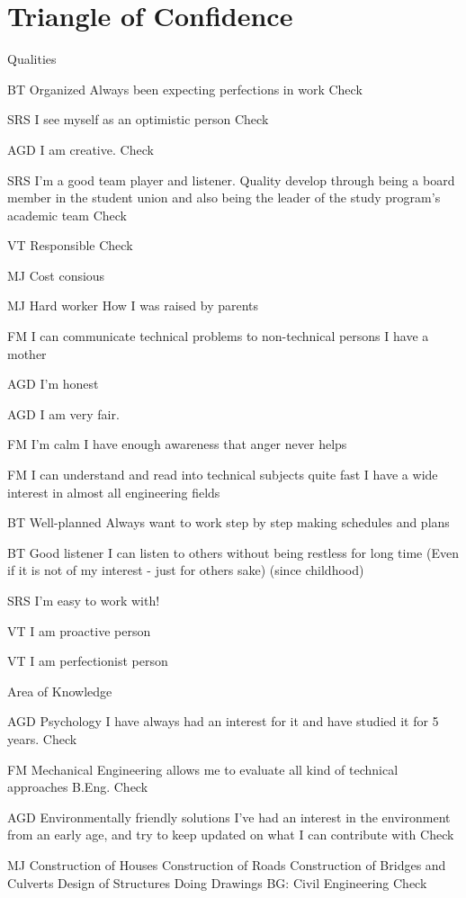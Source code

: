 \section{Triangle of Confidence}

Qualities

BT
Organized
Always been expecting perfections in work
Check


SRS
I see myself as an optimistic person
Check


AGD
I am creative.
Check

SRS
I'm a good team player and listener.
Quality develop through being a board member in the student union and also being the leader of the study program's academic team
Check

VT
Responsible
Check




MJ
Cost consious

MJ
Hard worker
How I was raised by parents

FM
I can communicate technical problems to non-technical persons
I have a mother

AGD
I'm honest

AGD
I am very fair.

FM
I'm calm
I have enough awareness that anger never helps

FM
I can understand and read into technical subjects quite fast
I have a wide interest in almost all engineering fields


BT
Well-planned
Always want to work step by step making schedules and plans

BT
Good listener
I can listen to others without being restless for long time (Even if it is not of my interest - just for others sake) (since childhood)

SRS
I'm easy to work with!


VT
I am proactive person

VT
I am perfectionist person




Area of Knowledge

AGD
Psychology
I have always had an interest for it and have studied it for 5 years.
Check


FM
Mechanical Engineering allows me to evaluate all kind of technical approaches
B.Eng.
Check

AGD
Environmentally friendly solutions
I've had an interest in the environment from an early age, and try to keep updated on what I can contribute with
Check

MJ
Construction of Houses
Construction of Roads
Construction of Bridges and Culverts
Design of Structures
Doing Drawings
BG: Civil Engineering
Check

